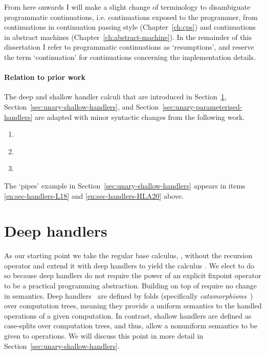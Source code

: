 \documentclass[12pt,phd,lfcs,twoside,openright,logo,leftchapter,normalheadings]{infthesis}
\theoremstyle{plain}
\theoremstyle{definition}
\begin{document}
From here onwards I will make a slight change of terminology to
disambiguate programmatic continuations, i.e. continuations exposed to
the programmer, from continuations in continuation passing style
(Chapter~\ref{ch:cps}) and continuations in abstract machines
(Chapter~\ref{ch:abstract-machine}). In the remainder of this
dissertation I refer to programmatic continuations as `resumptions',
and reserve the term `continuation' for continuations concerning the
implementation details.

\paragraph{Relation to prior work} The deep and shallow handler
calculi that are introduced in Section~\ref{sec:unary-deep-handlers},
Section~\ref{sec:unary-shallow-handlers}, and
Section~\ref{sec:unary-parameterised-handlers} are adapted with minor
syntactic changes from the following work.
%
\begin{enumerate}[i]
    \item {}
    \item {}  \label{en:sec-handlers-L18}
    \item {} \label{en:sec-handlers-HLA20}
\end{enumerate}
%
The `pipes' example in Section~\ref{sec:unary-shallow-handlers}
appears in items \ref{en:sec-handlers-L18} and
\ref{en:sec-handlers-HLA20} above.

\section{Deep handlers}
\label{sec:unary-deep-handlers}
%

As our starting point we take the regular base calculus, \BCalc{},
without the recursion operator and extend it with deep handlers to
yield the calculus \HCalc{}. We elect to do so because deep handlers
do not require the power of an explicit fixpoint operator to be a
practical programming abstraction. Building \HCalc{} on top of
\BCalcRec{} require no change in semantics.
%
Deep handlers~\cite{PlotkinP09,Pretnar10} are defined by folds
(specifically \emph{catamorphisms}~\cite{MeijerFP91}) over computation
trees, meaning they provide a uniform semantics to the handled
operations of a given computation. In contrast, shallow handlers are
defined as case-splits over computation trees, and thus, allow a
nonuniform semantics to be given to operations. We will discuss this
point in more detail in Section~\ref{sec:unary-shallow-handlers}.
\end{document}
